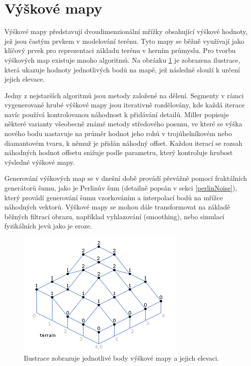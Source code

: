\section{Výškové mapy}
\label{heightMaps}
Výškové mapy představují dvoudimenzionální mřížky obsahující výškové hodnoty, jež jsou častým prvkem v modelování terénu. Tyto mapy se běžně využívají jako klíčový prvek pro reprezentaci základu terénu v herním průmyslu. Pro tvorbu výškových map existuje mnoho algoritmů. Na obrázku \ref{HeightMap} je zobrazena ilustrace, která ukazuje hodnoty jednotlivých bodů na mapě, jež následně slouží k určení jejich elevace. \cite{heightMap08}

Jedny z nejstarších algoritmů jsou metody založené na dělení. Segmenty v rámci vygenerované hrubé výškové mapy jsou iterativně rozdělovány, kde každá iterace navíc používá kontrolovanou náhodnost k přidávání detailů. Miller \cite{Miller19860831} popisuje některé varianty všeobecně známé metody středového posunu, ve které se výška nového bodu nastavuje na průměr hodnot jeho rohů v trojúhelníkovém nebo diamantovém tvaru, k němuž je přidán náhodný offset. Každou iterací se rozsah náhodných hodnot offsetu snižuje podle parametru, který kontroluje hrubost výsledné výškové mapy. 

Generování výškových map se v dnešní době provádí převážně pomocí fraktálních generátorů šumu, jako je Perlinův šum (detailně popsán v sekci \ref{perlinNoise}), který provádí generování šumu vzorkováním a interpolací bodů na mřížce náhodných vektorů. Výškové mapy se mohou dále transformovat na základě běžných filtrací obrazu, například vyhlazování (smoothing), nebo simulací fyzikálních jevů jako je eroze. \cite{inproceedings}

\begin{figure}[H]
	\centering
	\includegraphics[scale=0.9]{obrazky-figures/HeightMap.png}
	\caption{Ilustrace zobrazuje jednotlivé body výškové mapy a jejich elevaci.}
	\label{HeightMap}
\end{figure}

